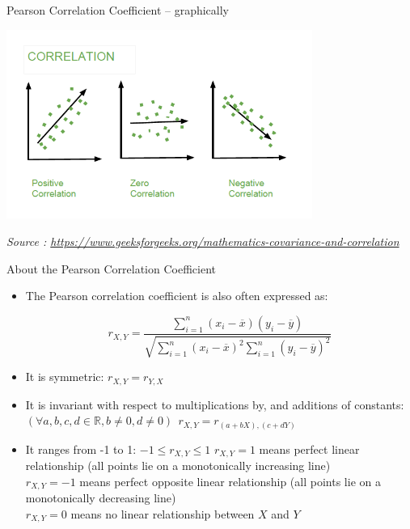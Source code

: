 \documentclass{beamer}
\begin{document}
\begin{frame}
{\centerline{Pearson Correlation Coefficient -- graphically}}


\begin{center}
\includegraphics[width=10cm]{P2023.AIBCCSS.FoundationsDataScience/Correl.png}
\end{center} 
\textit{\small
Source : \url{https://www.geeksforgeeks.org/mathematics-covariance-and-correlation}}
\end{frame}


\begin{frame}
{\centerline{About the Pearson Correlation Coefficient}}

\begin{itemize}
\item The Pearson correlation coefficient is also often expressed as:

$$ r_{X,Y} = \frac{\sum_{i=1}^{n}(x_i-\overline{x})(y_i-\overline{y})}{\sqrt{\sum_{i=1}^{n}(x_i-\overline{x})^2\sum_{i=1}^{n}(y_i-\overline{y})^2}} $$
\item It is symmetric: $r_{X,Y} = r_{Y,X}$
\item It is invariant with respect to multiplications by, and additions of constants: $(\forall a, b, c, d \in \mathbb{R} , b \neq 0, d \neq 0)~~ r_{X,Y} = r_{(a + bX),(c + dY)} $
\item It ranges from -1 to 1: $-1 \leq r_{X,Y} \leq 1$
$ r_{X,Y}=1$ means perfect linear relationship (all points lie on a monotonically increasing line) \\
$ r_{X,Y}=-1$ means perfect opposite linear relationship (all points lie on a monotonically decreasing line)\\
$ r_{X,Y}= 0$ means no linear relationship between $X$ and $Y$
\end{itemize}


\end{frame}
\end{document}
